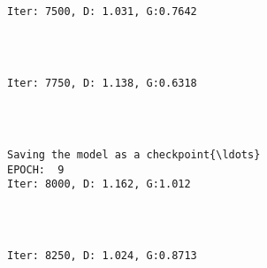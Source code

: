 \documentclass[11pt]{article}
\begin{document}
    \begin{center}
    \end{center}
    { \hspace*{\fill} \\}
    
    \begin{Verbatim}[commandchars=\\\{\}]

Iter: 7500, D: 1.031, G:0.7642
    \end{Verbatim}

    \begin{center}
    \end{center}
    { \hspace*{\fill} \\}
    
    \begin{Verbatim}[commandchars=\\\{\}]

Iter: 7750, D: 1.138, G:0.6318
    \end{Verbatim}

    \begin{center}
    \end{center}
    { \hspace*{\fill} \\}
    
    \begin{Verbatim}[commandchars=\\\{\}]

Saving the model as a checkpoint{\ldots}
EPOCH:  9
Iter: 8000, D: 1.162, G:1.012
    \end{Verbatim}

    \begin{center}
    \end{center}
    { \hspace*{\fill} \\}
    
    \begin{Verbatim}[commandchars=\\\{\}]

Iter: 8250, D: 1.024, G:0.8713
    \end{Verbatim}
\end{document}
